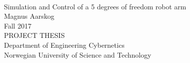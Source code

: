 \documentclass[10pt,b5paper,twoside,openright]{book}
\begin{document}
\pagestyle{plain}

\thispagestyle{empty}
\mbox{}\\[6pc]
\begin{center}
\Huge{Simulation and Control of a 5 degrees of freedom robot arm}\\[2pc]

\Large{Magnus Aarskog}\\[1pc]
\large{Fall 2017}\\[2pc]

PROJECT THESIS\\
Department of Engineering Cybernetics\\
Norwegian University of Science and Technology
\end{center}
\vfill


\frontmatter
\pagestyle{plain}
\begingroup
\let\cleardoublepage\clearpage



\tableofcontents \clearpage
\listoftables    \clearpage
\listoffigures   \clearpage
\endgroup



\mainmatter
\pagestyle{headings}






%
%
%
%


\backmatter
{}

\end{document}
